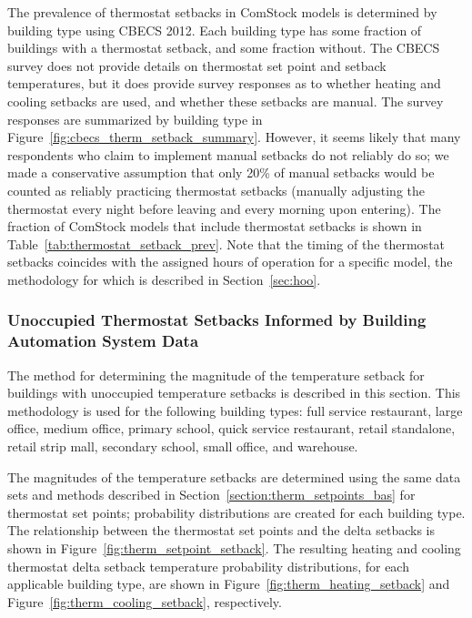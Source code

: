 The prevalence of thermostat setbacks in ComStock models is determined by building type using CBECS 2012. Each building type has some fraction of buildings with a thermostat setback, and some fraction without. The CBECS survey does not provide details on thermostat set point and setback temperatures, but it does provide survey responses as to whether heating and cooling setbacks are used, and whether these setbacks are manual. The survey responses are summarized by building type in Figure~\ref{fig:cbecs_therm_setback_summary}. However, it seems likely that many respondents who claim to implement manual setbacks do not reliably do so; we made a conservative assumption that only 20\% of manual setbacks would be counted as reliably practicing thermostat setbacks (manually adjusting the thermostat every night before leaving and every morning upon entering). The fraction of ComStock models that include thermostat setbacks is shown in Table~\ref{tab:thermostat_setback_prev}. Note that the timing of the thermostat setbacks coincides with the assigned hours of operation for a specific model, the methodology for which is described in Section~\ref{sec:hoo}.

\medskip


\subsubsection{Unoccupied Thermostat Setbacks Informed by Building Automation System Data}

The method for determining the magnitude of the temperature setback for buildings with unoccupied temperature setbacks is described in this section. This methodology is used for the following building types: full service restaurant, large office, medium office, primary school, quick service restaurant, retail standalone, retail strip mall, secondary school, small office, and warehouse.

The magnitudes of the temperature setbacks are determined using the same data sets and methods described in Section~\ref{section:therm_setpoints_bas} for thermostat set points; probability distributions are created for each building type. The relationship between the thermostat set points and the delta setbacks is shown in Figure~\ref{fig:therm_setpoint_setback}. The resulting heating and cooling thermostat delta setback temperature probability distributions, for each applicable building type, are shown in Figure~\ref{fig:therm_heating_setback} and Figure~\ref{fig:therm_cooling_setback}, respectively.

